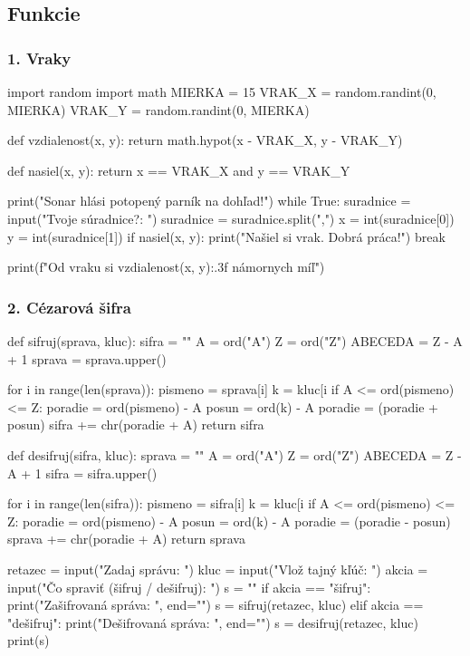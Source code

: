 \subsection{Funkcie}

\subsubsection*{1. Vraky}
\begin{solution}
import random
import math
MIERKA = 15
VRAK_X = random.randint(0, MIERKA)
VRAK_Y = random.randint(0, MIERKA)

def vzdialenost(x, y):
    return math.hypot(x - VRAK_X, y - VRAK_Y)
  
def nasiel(x, y):
    return x == VRAK_X and y == VRAK_Y

print("Sonar hlási potopený parník na dohľad!")
while True:
    suradnice = input("Tvoje súradnice?: ")
    suradnice = suradnice.split(",")
    x = int(suradnice[0])
    y = int(suradnice[1])
    if nasiel(x, y):
        print("Našiel si vrak. Dobrá práca!")
        break

    print(f"Od vraku si {vzdialenost(x, y):.3f} námornych míľ")
\end{solution}

\subsubsection*{2. Cézarová šifra}
\begin{solution}
def sifruj(sprava, kluc):
    sifra = ""
    A = ord("A")
    Z = ord("Z")
    ABECEDA = Z - A + 1
    sprava = sprava.upper()

    for i in range(len(sprava)):
        pismeno = sprava[i]
        k = kluc[i %
        if A <= ord(pismeno) <= Z:
            poradie = ord(pismeno) - A
            posun = ord(k) - A
            poradie = (poradie + posun) %
            sifra += chr(poradie + A)
    return sifra

def desifruj(sifra, kluc):
    sprava = ""
    A = ord("A")
    Z = ord("Z")
    ABECEDA = Z - A + 1
    sifra = sifra.upper()

    for i in range(len(sifra)):
        pismeno = sifra[i]
        k = kluc[i %
        if A <= ord(pismeno) <= Z:
            poradie = ord(pismeno) - A
            posun = ord(k) - A
            poradie = (poradie - posun) %
            sprava += chr(poradie + A)
    return sprava

retazec = input("Zadaj správu: ")
kluc = input("Vlož tajný kľúč: ")
akcia = input("Čo spraviť (šifruj / dešifruj): ")
s = ""
if akcia == "šifruj":
    print("Zašifrovaná správa: ", end="")
    s = sifruj(retazec, kluc)
elif akcia == "dešifruj":
    print("Dešifrovaná správa: ", end="")
    s = desifruj(retazec, kluc)
print(s)
\end{solution}

